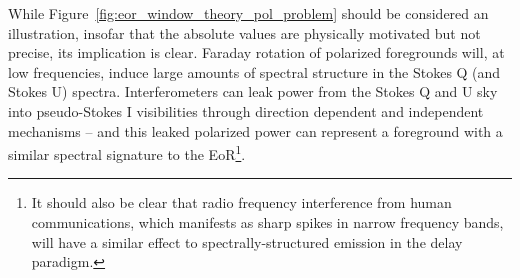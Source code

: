 While Figure~\ref{fig:eor_window_theory_pol_problem} should be considered an illustration, insofar that the absolute values are physically motivated but not precise, its implication is clear. Faraday rotation of polarized foregrounds will, at low frequencies, induce large amounts of spectral structure in the Stokes Q (and Stokes U) spectra. Interferometers can leak power from the Stokes Q and U sky into pseudo-Stokes I visibilities through direction dependent and independent mechanisms -- and this leaked polarized power can represent a foreground with a similar spectral signature to the EoR\footnote{It should also be clear that radio frequency interference from human communications, which manifests as sharp spikes in narrow frequency bands, will have a similar effect to spectrally-structured emission in the delay paradigm.}.

